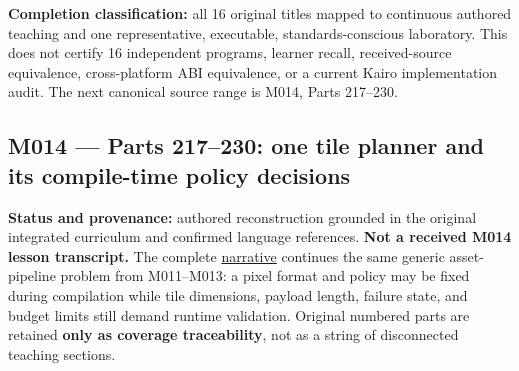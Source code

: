 \textbf{Completion classification:} all 16 original titles mapped to continuous authored teaching and one representative, executable, standards-conscious laboratory. This does not certify 16 independent programs, learner recall, received-source equivalence, cross-platform ABI equivalence, or a current Kairo implementation audit. The next canonical source range is M014, Parts 217--230.

\subsection{M014 --- Parts 217--230: one tile planner and its compile-time policy decisions}\label{appendix-fd090d982a15-m014-parts-217230-one-tile-planner-and-its-compile-time-policy-decisions}

\hypertarget{appendix-fd090d982a15-m014-parts-217230-one-tile-planner-and-its-compile-time-policy-decisions}{}

\textbf{Status and provenance:} authored reconstruction grounded in the original integrated curriculum and confirmed language references. \textbf{Not a received M014 lesson transcript.} The complete \hyperref[01-foundations-i-ch005-a-texture-tile-that-chooses-its-work-before-the-frame-begins]{narrative} continues the same generic asset-pipeline problem from M011--M013: a pixel format and policy may be fixed during compilation while tile dimensions, payload length, failure state, and budget limits still demand runtime validation. Original numbered parts are retained \textbf{only as coverage traceability}, not as a string of disconnected teaching sections.

